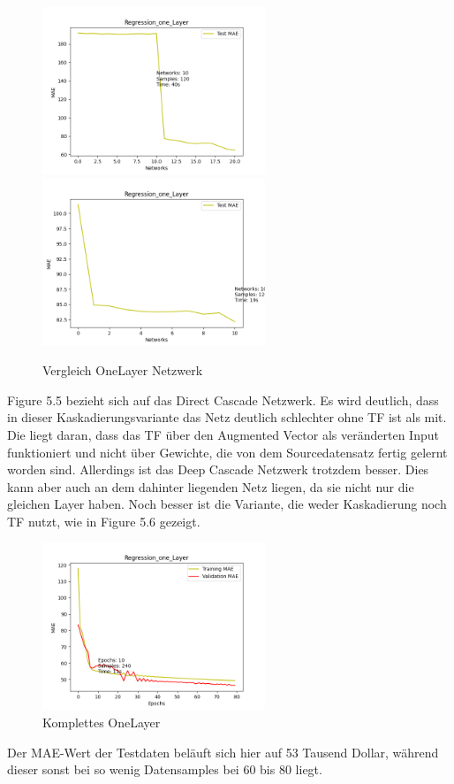 \begin{figure}[htpb]
    \includegraphics[height=5cm]{../../Plots/ba_plots/regression_small/onelayer_ts.png}
    \includegraphics[height=5cm]{../../Plots/ba_plots/regression_small/woonelayer_ts.png}
    \caption{\label{fig:smallonl} Vergleich OneLayer Netzwerk}
\end{figure}

Figure 5.5 bezieht sich auf das Direct Cascade Netzwerk. Es wird deutlich, dass in dieser Kaskadierungsvariante das Netz deutlich schlechter 
ohne TF ist als mit. Die liegt daran, dass das TF über den Augmented Vector als veränderten Input funktioniert und nicht über Gewichte, die 
von dem Sourcedatensatz fertig gelernt worden sind. Allerdings ist das Deep Cascade Netzwerk trotzdem besser. Dies kann aber auch 
an dem dahinter liegenden Netz liegen, da sie nicht nur die gleichen Layer haben. Noch besser ist die Variante, 
die weder Kaskadierung noch TF nutzt, wie in Figure 5.6 gezeigt. 

\begin{figure}
    \centering
    \includegraphics[height=5cm]{../../Plots/ba_plots/regression_small/onelayer_complete.png}
    \caption{\label{fig:smallonlcomp} Komplettes OneLayer}
\end{figure}

Der MAE-Wert der Testdaten beläuft sich hier auf 53 Tausend Dollar, während dieser sonst bei so wenig Datensamples bei 60 bis 80 liegt. 
